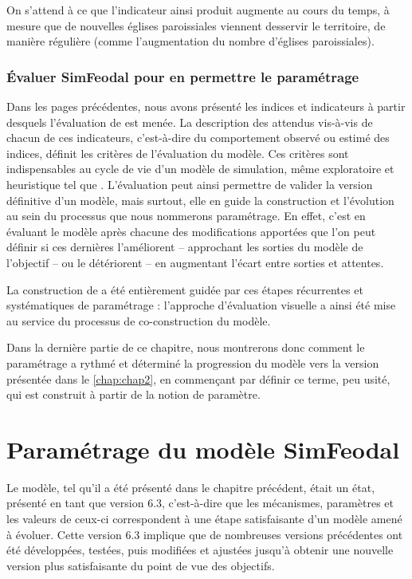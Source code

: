 On s'attend à ce que l'indicateur ainsi produit augmente au cours du temps, à mesure que de nouvelles églises paroissiales viennent desservir le territoire, de manière régulière (comme l'augmentation du nombre d'églises paroissiales).

\subsubsection{Évaluer SimFeodal pour en permettre le paramétrage}

Dans les pages précédentes, nous avons présenté les indices et indicateurs à partir desquels l'évaluation de \simfeodal{} est menée.
La description des attendus vis-à-vis de chacun de ces indicateurs, c'est-à-dire du comportement observé ou estimé des indices, définit les critères de l'évaluation du modèle.
Ces critères sont indispensables au cycle de vie d'un modèle de simulation, même exploratoire et heuristique tel que \simfeodal{}.
L'évaluation peut ainsi permettre de \og valider\fg{} la version définitive d'un modèle, mais surtout, elle en guide la construction et l'évolution au sein du processus que nous nommerons paramétrage.
En effet, c'est en évaluant le modèle après chacune des modifications apportées que l'on peut définir si ces dernières l'améliorent -- approchant les sorties du modèle de l'objectif -- ou le détériorent -- en augmentant l'écart entre sorties et attentes.

La construction de \simfeodal{} a été entièrement guidée par ces étapes récurrentes et systématiques de paramétrage : l'approche d'évaluation visuelle a ainsi été mise au service du processus de co-construction du modèle.

Dans la dernière partie de ce chapitre, nous montrerons donc comment le paramétrage a rythmé et déterminé la progression du modèle vers la version présentée dans le \cref{chap:chap2}, en commençant par définir ce terme, peu usité, qui est construit à partir de la notion de paramètre.

\section{Paramétrage du modèle SimFeodal}


Le modèle, tel qu'il a été présenté dans le chapitre précédent, était un \og état\fg{}, présenté en tant que \og version 6.3\fg{}, c'est-à-dire que les mécanismes, paramètres et les valeurs de ceux-ci correspondent à une étape satisfaisante d'un modèle amené à évoluer.
Cette version 6.3 implique que de nombreuses versions précédentes ont été développées, testées, puis modifiées et ajustées jusqu'à obtenir une nouvelle version plus satisfaisante du point de vue des objectifs.

